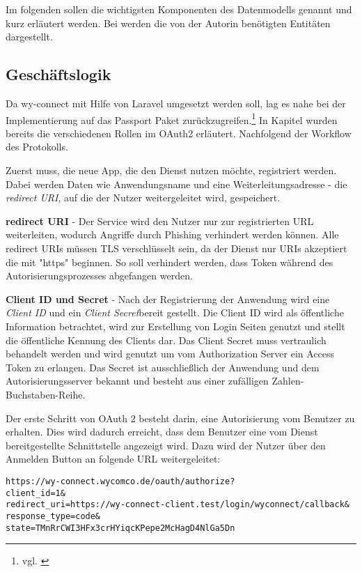 Im folgenden sollen die wichtigsten Komponenten des Datenmodells genannt und kurz erläutert werden. Bei  werden die von der Autorin benötigten Entitäten dargestellt. 


\subsection{Geschäftslogik}
\label{sec:Geschaeftslogik}

Da wy-connect mit Hilfe von Laravel umgesetzt werden soll, lag es nahe bei der Implementierung auf das Passport Paket zurückzugreifen.\footnote{vgl. \cite{Passport}}
In Kapitel  wurden bereits die verschiedenen Rollen im OAuth2 erläutert. Nachfolgend der Workflow des Protokolls.

Zuerst muss, die neue App, die den Dienst nutzen möchte, registriert werden. Dabei werden Daten wie Anwendungsname und eine Weiterleitungsadresse - die \textit{redirect URI}, auf die der Nutzer weitergeleitet wird, gespeichert.

\textbf{redirect URI} -
Der Service wird den Nutzer nur zur registrierten URL weiterleiten, wodurch Angriffe durch \zB Phishing verhindert werden können. Alle redirect URIs müssen TLS verschlüsselt sein, da der Dienst nur URIs akzeptiert die mit "https" beginnen. So soll verhindert werden, dass Token während des Autorisierungsprozesses abgefangen werden. 

\textbf{Client ID und Secret} -
Nach der Registrierung der Anwendung wird eine \textit{Client ID} und ein \textit{Client Secret}bereit gestellt. Die Client ID wird als öffentliche Information betrachtet, wird zur Erstellung von Login Seiten genutzt und stellt die öffentliche Kennung des Clients dar. 
Das Client Secret muss vertraulich behandelt werden und wird genutzt um vom Authorization Server ein Access Token zu erlangen. Das Secret ist ausschließlich der Anwendung und dem Autorisierungsserver bekannt und besteht aus einer zufälligen Zahlen-Buchstaben-Reihe. 

Der erste Schritt von OAuth 2 besteht darin, eine Autorisierung vom Benutzer zu erhalten. Dies wird dadurch erreicht, dass dem Benutzer eine vom Dienst bereitgestellte Schnittstelle angezeigt wird. Dazu wird der Nutzer über den Anmelden Button an folgende URL weitergeleitet:

\texttt{https://wy-connect.wycomco.de/oauth/authorize?\\
client\_id=1\& \\
redirect\_uri=https://wy-connect-client.test/login/wyconnect/callback\& \\
response\_type=code\& \\
state=TMnRrCWI3HFx3crHYiqcKPepe2McHagD4NlGa5Dn
}

